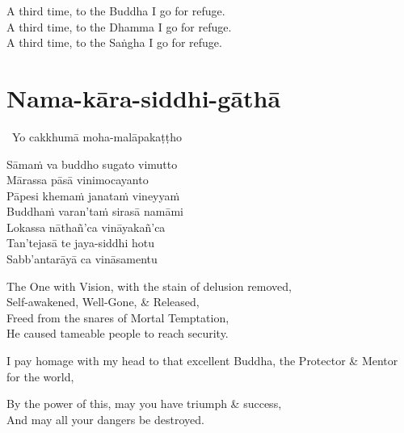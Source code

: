 \begin{english-verses}
  A third time, to the Buddha I go for refuge.\\
  A third time, to the Dhamma I go for refuge.\\
  A third time, to the Saṅgha I go for refuge.
\end{english-verses}


\section{Nama-kāra-siddhi-gāthā}
\label{nama-kara-siddhi-gatha}

\begin{pali-leader}
  \anglebracketleft\ \hspace{-0.5mm}Yo cakkhumā moha-malāpakaṭṭho \hspace{-0.5mm}\anglebracketright\
\end{pali-leader}
\begin{pali-hangtogether}
  Sāmaṁ va buddho sugato vimutto\\
  Mārassa pāsā vinimocayanto\\
  Pāpesi khemaṁ janataṁ vineyyaṁ\\
  Buddhaṁ varan'taṁ sirasā namāmi\\
  Lokassa nāthañ'ca vināyakañ'ca\\
  Tan'tejasā te jaya-siddhi hotu\\
  Sabb'antarāyā ca vināsamentu
\end{pali-hangtogether}

\begin{english-verses}
  The One with Vision, with the stain of delusion removed,\\
  Self-awakened, Well-Gone, \& Released,\\
  Freed from the snares of Mortal Temptation,\\
  He caused tameable people to reach security.\\
  \begin{english-hangtogether-verses}
    I pay homage with my head to that excellent Buddha, the Protector \& Mentor for the world,\\
  \end{english-hangtogether-verses}
  By the power of this, may you have triumph \& success,\\
  And may all your dangers be destroyed.
\end{english-verses}

